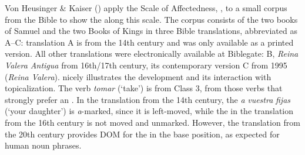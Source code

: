 \documentclass[output=paper]{LSP/langsci}
\begin{document}
Von Heusinger \& Kaiser (\citeyear{vonHeusingeretal2007Differential}) apply the Scale of Affectedness, \cf {}, to a small corpus from the Bible to show the  along this scale. The corpus consists of the two books of Samuel and the two Books of Kings in three Bible translations, abbreviated as A–C: translation A is from the 14th century and was only available as a printed version. All other translations were electronically available at Biblegate: B, \textit{Reina Valera Antigua} from 16th/17th century, its contemporary version C from 1995 (\textit{Reina Valera}).  nicely illustrates the development and its interaction with topicalization. The verb \textit{tomar} (‘take’) is from Class 3, \ie from those verbs that strongly prefer an  . In the translation from the 14th century, the  \textit{a} \textit{vuestra} \textit{fijas} (‘your daughter’) is \textit{a}-marked, since it is left-moved, while the  in the translation from the 16th century is not moved and unmarked. However, the translation from the 20th century provides DOM for the  in the base position, as expected for  human noun phrases.

\end{document}
